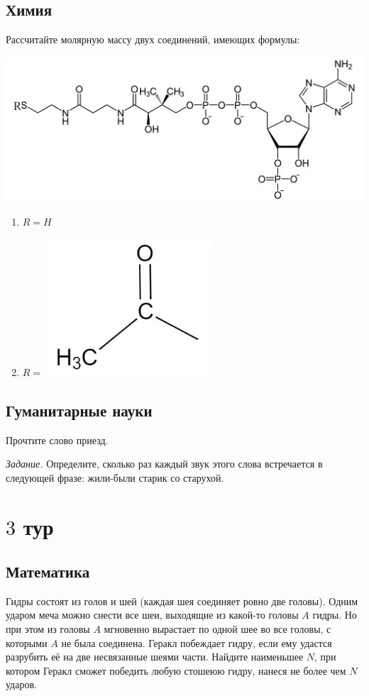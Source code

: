 \documentclass[a4paper, 12pt]{article}
\begin{document}
	 \subsection*{Химия}
	 Рассчитайте молярную массу двух соединений, имеющих формулы:
	 \begin{center}
	 	\includegraphics[width=\textwidth]{4}
	 \end{center}
 	 \begin{enumerate}[label=\asbuk*), ref=\asbuk*]
 	 	\item $R=H$
 	 	\item $R=$
 	 	\includegraphics[scale=0.3, trim=5mm 30mm 0 0]{5}
 	 \end{enumerate}
  \hspace*{1pt}
  	 \subsection*{Гуманитарные науки}
  	 Прочтите слово приезд.
  	 
  	 \noindent \textit{Задание.} Определите, сколько раз каждый звук этого слова встречается в следующей фразе: жили-были старик со старухой.
  	 
	 \newpage
	 \clearpage
	 \pagestyle{empty}
	 \section*{$3$ тур}
	 \subsection*{Математика}
	 Гидры состоят из голов и шей (каждая шея соединяет ровно две головы). Одним ударом меча можно снести все шеи, выходящие из какой-то головы $A$ гидры. Но при этом из головы $A$ мгновенно вырастает по одной шее во все головы, с которыми $A$ не была соединена. Геракл побеждает гидру, если ему удастся разрубить её на две несвязанные шеями части. Найдите наименьшее $N$, при котором Геракл сможет победить любую стошеюю гидру, нанеся не более чем $N$ ударов.
\end{document}
